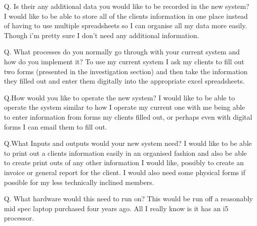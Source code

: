 Q. Is their any additional data you would like to be recorded in the new system?
I would like to be able to store all of the clients information in one place instead of having to use multiple spreadsheets so I can organise all my data more easily. Though i'm pretty sure I don't need any additional information.

Q. What processes do you normally go through with your current system and how do you implement it?
To use my current system I ask my clients to fill out two forms (presented in the investigation section) and then take the information they filled out and enter them digitally into the appropriate excel spreadsheets.

Q.How would you like to operate the new system?
I would like to be able to operate the system similar to how I operate my current one with me being able to enter information from forms my clients filled out, or perhaps even with digital forms I can email them to fill out.

Q.What Inputs and outputs would your new system need? 
I would like to be able to print out a clients information easily in an organised fashion and also be able to create print outs of any other information I would like, possibly to create an invoice or general report for the client. I would also need some physical forms if possible for my less technically inclined members.

Q. What hardware would this need to run on?
﻿This would be run off a reasonably mid spec laptop purchased four years ago. All I really know is it has an i5 processor.

